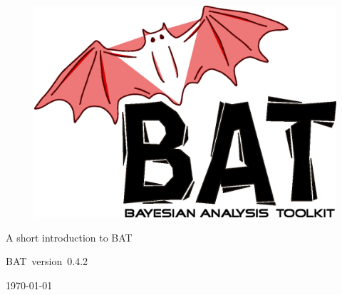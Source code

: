 \documentclass[11pt, a4paper]{article}
\newcommand{\bat}{{\sc BAT}}
\newcommand{\versionno}{0.4.2}
\newcommand{\version}{version~\versionno}
\begin{document}

\thispagestyle{empty}

\begin{figure}
\includegraphics[scale=0.25]{bat.eps}
\end{figure}

\vspace*{1cm}

\begin{center}


{\Large A short introduction to \bat}
\\

\vspace{1cm}

{\large \bat\ \version}

\end{center}

\thispagestyle{empty}

\vfill

\begin{center}
\today
\end{center}

\pagebreak


\thispagestyle{empty}

\enlargethispage{2cm}

\tableofcontents

\pagebreak

\end{document}
